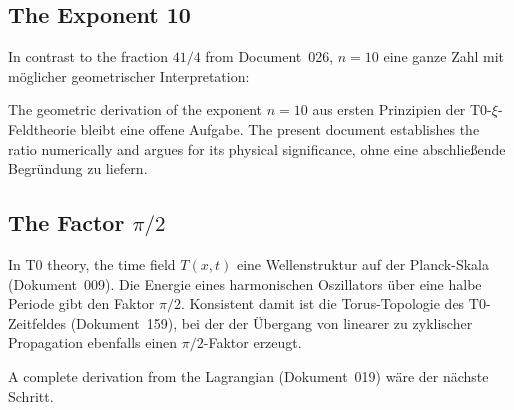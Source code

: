 \subsection{The Exponent 10}

In contrast to the fraction $41/4$ from Document~026, $n = 10$ eine ganze Zahl
mit möglicher geometrischer Interpretation:

\begin{table}[H]
    \centering
    \caption{Possible interpretations of the exponent $n=10$.
    Which is fundamental remains open and
    would need a separate document.}
    \label{tab:exp10}
\end{table}

\begin{important}
    The geometric derivation of the exponent $n = 10$ aus
    ersten Prinzipien der T0-$\xi$-Feldtheorie bleibt eine offene Aufgabe.
    The present document establishes the ratio numerically and
    argues for its physical significance, ohne eine
    abschließende Begründung zu liefern.
\end{important}

\subsection{The Factor \texorpdfstring{$\pi/2$}{pi/2}}

In T0 theory, the time field $T(x,t)$ eine Wellenstruktur
auf der Planck-Skala (Dokument~009). Die Energie eines harmonischen
Oszillators über eine halbe Periode gibt den Faktor $\pi/2$. Konsistent
damit ist die Torus-Topologie des T0-Zeitfeldes (Dokument~159), bei der
der Übergang von linearer zu zyklischer Propagation ebenfalls einen
$\pi/2$-Faktor erzeugt.

A complete derivation from the Lagrangian (Dokument~019) wäre der
nächste Schritt.

